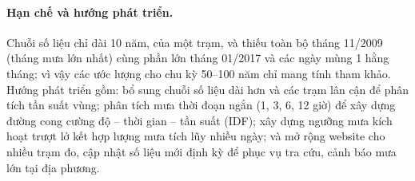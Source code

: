 \paragraph{Hạn chế và hướng phát triển.} Chuỗi số liệu chỉ dài 10 năm, của một trạm, và thiếu toàn bộ tháng 11/2009 (tháng mưa lớn nhất) cùng phần lớn tháng 01/2017 và các ngày mùng 1 hằng tháng; vì vậy các ước lượng cho chu kỳ 50--100 năm chỉ mang tính tham khảo. Hướng phát triển gồm: bổ sung chuỗi số liệu dài hơn và các trạm lân cận để phân tích tần suất vùng; phân tích mưa thời đoạn ngắn (1, 3, 6, 12 giờ) để xây dựng đường cong cường độ -- thời gian -- tần suất (IDF); xây dựng ngưỡng mưa kích hoạt trượt lở kết hợp lượng mưa tích lũy nhiều ngày; và mở rộng website cho nhiều trạm đo, cập nhật số liệu mới định kỳ để phục vụ tra cứu, cảnh báo mưa lớn tại địa phương.
